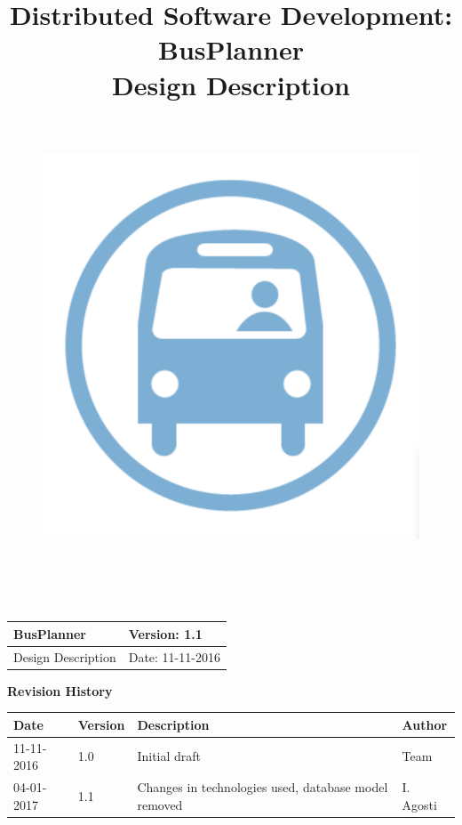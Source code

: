 \documentclass[a4paper, 12pt]{article}
\title{
	\textbf{D}istributed \textbf{S}oftware \textbf{D}evelopment: \textbf{BusPlanner}\\
	\textbf{Design Description}\\
	\begin{figure}[H]
		\centering
		\includegraphics[width=13cm, height=13cm]{Bus_logo}
	\end{figure}
	\date{}
}
\begin{document}
	\begin{table}[t]
		\centering
		\begin{tabular}{| m{6cm} | m{6cm} |}
			\hline
			BusPlanner & Version: 1.1\\
			\hline
			Design Description & Date: 11-11-2016\\
			\hline
		\end{tabular}
	\end{table}
	\maketitle 
	\begin{center}
		\textbf{\Large Revision History}
	\end{center}
	\begin{table}[h]
		\centering
		\begin{tabular}{| m{2cm} | m{2cm} | m{6cm} | m{2cm} |}
			\hline
			\textbf{Date} & \textbf{Version} & \textbf{Description} & \textbf{Author}\\
			\hline
			11-11-2016 & 1.0 & Initial draft & Team\\
			\hline
			04-01-2017 & 1.1 & Changes in technologies used, database model removed & I. Agosti\\
			\hline
		\end{tabular}
	\end{table}
\newpage
	\tableofcontents
	
	
	
	
	
\end{document}
